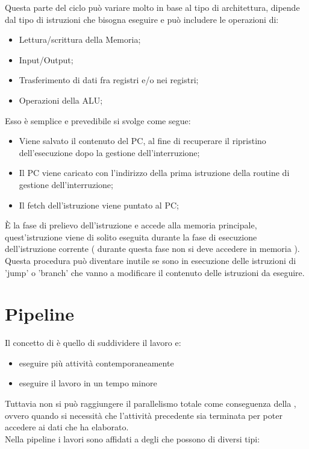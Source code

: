 \documentclass[arch.tex]{subfiles}
\begin{document}
%
\label{par:execute}
Questa parte del ciclo può variare molto in base al tipo di architettura, dipende dal tipo 
di istruzioni che bisogna eseguire e può includere le operazioni di:

\begin{itemize}
	\item Lettura/scrittura della Memoria;
	\item Input/Output;
	\item Trasferimento di dati fra registri e/o nei registri;
	\item Operazioni della ALU;
\end{itemize}

%
\label{par:interrupt}
Esso è semplice e prevedibile si svolge come segue:

\begin{itemize}
	\item Viene salvato il contenuto del PC, al fine di recuperare il ripristino dell'esecuzione dopo
		la gestione dell'interruzione;
	\item Il PC viene caricato con l'indirizzo della prima istruzione della routine di gestione 
		dell'interruzione;
	\item Il fetch dell'istruzione viene puntato al PC;
\end{itemize}

%
\label{par:prefetch}

È la fase di prelievo dell'istruzione e accede alla memoria principale, quest'istruzione viene di solito
eseguita durante la fase di esecuzione dell'istruzione corrente ( durante questa fase non si deve accedere in memoria ).\\
Questa procedura può diventare inutile se sono in esecuzione delle istruzioni di 'jump' o 'branch' che vanno
a modificare il contenuto delle istruzioni da eseguire.


\section{Pipeline}%
\label{sec:pipeline}
Il concetto di  è quello di suddividere il lavoro e:

\begin{itemize}
	\item eseguire più attività contemporaneamente
	\item eseguire il lavoro in un tempo minore
\end{itemize}
Tuttavia non si può raggiungere il parallelismo totale come conseguenza della , ovvero quando si necessità che l'attività precedente sia
terminata per poter accedere ai dati che ha elaborato.\\
Nella pipeline i lavori sono affidati a degli  che possono
di diversi tipi:
\end{document}
